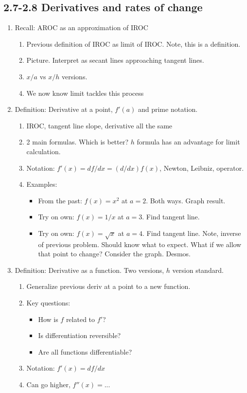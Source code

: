 \documentclass{article}
\begin{document}
\subsection{2.7-2.8 Derivatives and rates of change}
\begin{enumerate}

\item Recall: AROC as an approximation of IROC
\begin{enumerate}
\item Previous definition of IROC as limit of IROC. Note, this is a definition.
\item Picture. Interpret as secant lines approaching tangent lines.
\item $x/a$ vs $x/h$ versions.
\item We now know limit tackles this process
\end{enumerate}

\item Definition: Derivative at a point, $f'(a)$ and prime notation.
\begin{enumerate}
\item IROC, tangent line slope, derivative all the same
\item 2 main formulas. Which is better? $h$ formula has an advantage for limit calculation.
\item Notation: $f'(x)=df/dx=(d/dx)f(x)$, Newton, Leibniz, operator.
\item Examples:
\begin{itemize}
\item From the past: $f(x)=x^2$ at $a=2$. Both ways. Graph result.
\item Try on own: $f(x)=1/x$ at $a=3$. Find tangent line.
\item Try on own: $f(x)=\sqrt{x}$ at $a=4$. Find tangent line. Note, inverse of previous problem. Should know what to expect. What if we allow that point to change? Consider the graph. Desmos.
\end{itemize}
\end{enumerate}

\item Definition: Derivative as a function. Two versions, $h$ version standard.
\begin{enumerate}
\item Generalize previous deriv at a point to a new function.
\item Key questions:
\begin{itemize}
\item How is $f$ related to $f'$? 
\item Is differentiation reversible?
\item Are all functions differentiable?
\end{itemize} 
\item Notation: $f'(x) = df/dx$
\item Can go higher, $f''(x) = ...$
\end{enumerate}


\end{enumerate}
\end{document}
